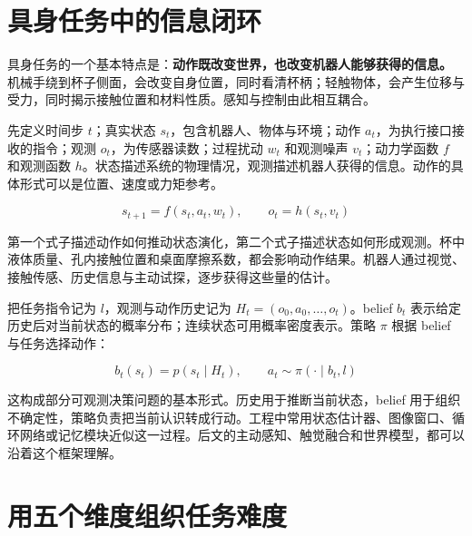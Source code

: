 \documentclass[UTF8,a4paper,11pt,oneside,openany,fontset=none]{ctexbook}
\begin{document}
\section{具身任务中的信息闭环}

具身任务的一个基本特点是：\textbf{动作既改变世界，也改变机器人能够获得的信息。} 机械手绕到杯子侧面，会改变自身位置，同时看清杯柄；轻触物体，会产生位移与受力，同时揭示接触位置和材料性质。感知与控制由此相互耦合。

先定义时间步 \(t\)；真实状态 \(s_{t}\)，包含机器人、物体与环境；动作 \(a_{t}\)，为执行接口接收的指令；观测 \(o_{t}\)，为传感器读数；过程扰动 \(w_{t}\) 和观测噪声 \(v_{t}\)；动力学函数 \(f\) 和观测函数 \(h\)。状态描述系统的物理情况，观测描述机器人获得的信息。动作的具体形式可以是位置、速度或力矩参考。

\[
s_{t+1}=f(s_t,a_t,w_t),\qquad o_t=h(s_t,v_t)
\]

第一个式子描述动作如何推动状态演化，第二个式子描述状态如何形成观测。杯中液体质量、孔内接触位置和桌面摩擦系数，都会影响动作结果。机器人通过视觉、接触传感、历史信息与主动试探，逐步获得这些量的估计。

把任务指令记为 \(l\)，观测与动作历史记为 \(H_t=(o_0,a_0,\ldots,o_t)\)。belief \(b_{t}\) 表示给定历史后对当前状态的概率分布；连续状态可用概率密度表示。策略 \(\pi\) 根据 belief 与任务选择动作：

\[
b_t(s_t)=p(s_t\mid H_t),\qquad a_t\sim\pi(\cdot\mid b_t,l)
\]

这构成部分可观测决策问题的基本形式。历史用于推断当前状态，belief 用于组织不确定性，策略负责把当前认识转成行动。工程中常用状态估计器、图像窗口、循环网络或记忆模块近似这一过程。后文的主动感知、触觉融合和世界模型，都可以沿着这个框架理解。

\section{用五个维度组织任务难度}
\end{document}
